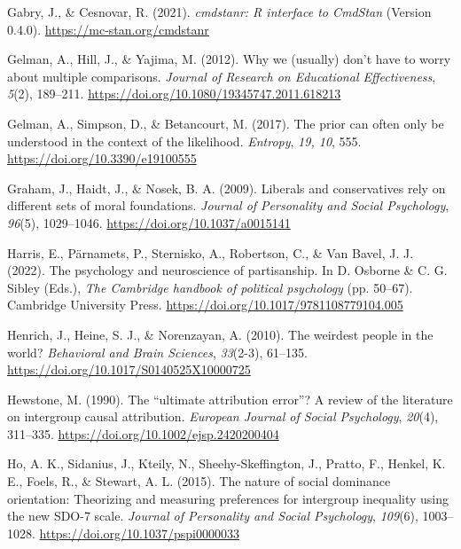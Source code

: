 \documentclass[12pt, letterpaper]{article}
\newenvironment{CSLReferences}[2]{}{}
\begin{document}
\begin{CSLReferences}{1}{0}
\leavevmode{}%
Gabry, J., \& Cesnovar, R. (2021). \emph{{cmdstanr}: {R} interface to
{CmdStan}} (Version 0.4.0). \url{https://mc-stan.org/cmdstanr}

\leavevmode{}%
Gelman, A., Hill, J., \& Yajima, M. (2012). Why we (usually) don't have
to worry about multiple comparisons. \emph{Journal of Research on
Educational Effectiveness}, \emph{5}(2), 189--211.
\url{https://doi.org/10.1080/19345747.2011.618213}

\leavevmode{}%
Gelman, A., Simpson, D., \& Betancourt, M. (2017). The prior can often
only be understood in the context of the likelihood. \emph{Entropy},
\emph{19, 10}, 555. \url{https://doi.org/10.3390/e19100555}

\leavevmode{}%
Graham, J., Haidt, J., \& Nosek, B. A. (2009). Liberals and
conservatives rely on different sets of moral foundations. \emph{Journal
of Personality and Social Psychology}, \emph{96}(5), 1029--1046.
\url{https://doi.org/10.1037/a0015141}

\leavevmode{}%
Harris, E., Pärnamets, P., Sternisko, A., Robertson, C., \& Van Bavel,
J. J. (2022). The psychology and neuroscience of partisanship. In D.
Osborne \& C. G. Sibley (Eds.), \emph{The {Cambridge} handbook of
political psychology} (pp. 50--67). Cambridge University Press.
\url{https://doi.org/10.1017/9781108779104.005}

\leavevmode{}%
Henrich, J., Heine, S. J., \& Norenzayan, A. (2010). The weirdest people
in the world? \emph{Behavioral and Brain Sciences}, \emph{33}(2-3),
61--135. \url{https://doi.org/10.1017/S0140525X10000725}

\leavevmode{}%
Hewstone, M. (1990). The {``ultimate attribution error''}? {A} review of
the literature on intergroup causal attribution. \emph{European Journal
of Social Psychology}, \emph{20}(4), 311--335.
\url{https://doi.org/10.1002/ejsp.2420200404}

\leavevmode{}%
Ho, A. K., Sidanius, J., Kteily, N., Sheehy-Skeffington, J., Pratto, F.,
Henkel, K. E., Foels, R., \& Stewart, A. L. (2015). The nature of social
dominance orientation: {Theorizing} and measuring preferences for
intergroup inequality using the new {SDO}-7 scale. \emph{Journal of
Personality and Social Psychology}, \emph{109}(6), 1003--1028.
\url{https://doi.org/10.1037/pspi0000033}


\end{CSLReferences}
\end{document}
